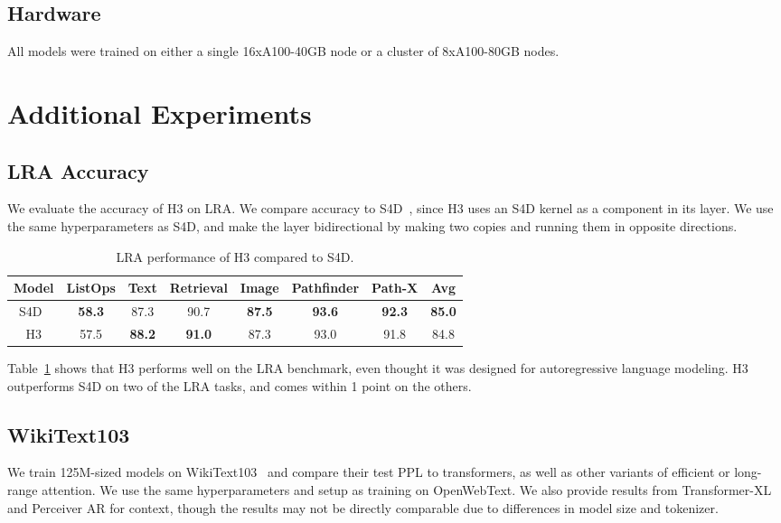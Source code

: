 \documentclass{article}
\newcommand{\hthree}{\textsc{H3}\xspace}
\begin{document}
\subsection{Hardware}
All models were trained on either a single 16xA100-40GB node or a cluster of 8xA100-80GB nodes.

\section{Additional Experiments}
\label{sec:app_additional_experiments}

\subsection{LRA Accuracy}
We evaluate the accuracy of \hthree on LRA.
We compare accuracy to S4D~\citep{gu2022parameterization}, since \hthree uses an S4D kernel as a component in its layer.
We use the same hyperparameters as S4D, and make the layer bidirectional by making two copies and running them in opposite directions.

\begin{table}[ht]
\small
    \centering
\caption{\label{table:lra_acc} LRA performance of \hthree compared to S4D. }
{
        \begin{tabular}{@{}|c|cccccc|c|@{}}
            \hline
Model & ListOps & Text & Retrieval & Image & Pathfinder & Path-X & Avg  \\ \hline
S4D~\citep{gu2022parameterization} & \textbf{58.3} & 87.3 & 90.7 & \textbf{87.5} & \textbf{93.6} & \textbf{92.3} & \textbf{85.0} \\
        \hthree & 57.5 & \textbf{88.2} & \textbf{91.0} & 87.3 & 93.0 & 91.8 & 84.8  \\ \hline
        \end{tabular}
    }
\end{table} 
Table~\ref{table:lra_acc} shows that \hthree performs well on the LRA benchmark, even thought it was designed for autoregressive language modeling.
\hthree outperforms S4D on two of the LRA tasks, and comes within 1 point on the others.

\subsection{WikiText103}
We train 125M-sized models on WikiText103~\citep{merity2016pointer} and compare their test PPL to transformers, as well as other variants of efficient or long-range attention.
We use the same hyperparameters and setup as training on OpenWebText.
We also provide results from Transformer-XL and Perceiver AR for context, though the results may not be directly comparable due to differences in model size and tokenizer.
\end{document}
